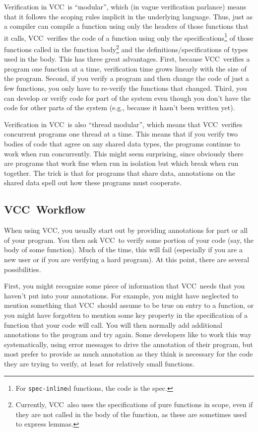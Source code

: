 \documentclass{report}
\newcommand{\Q}[1]{\lstinline~#1~}
\newcommand{\VCC}{VCC}
\begin{document}
Verification in \VCC\ is ``modular'', which (in vague verification
parlance) means that it follows the scoping rules implicit in the
underlying language. Thus, just as a compiler can compile a function
using only the headers of those functions that it calls,
\VCC\ verifies the code of a function using only the
specifications\footnote{For \Q{spec-inline}d functions, the code is the
  spec.} of those functions called in the function
body\footnote{Currently, \VCC\ also uses the specifications of pure functions
  in scope, even if they are not called in the body of the function,
  as these are sometimes used to express lemmas.} and the definitions/specifications of types used in the
body. This has three great advantages. First, because \VCC\ verifies a
program one function at a time, verification time grows linearly with
the size of the program. Second, if you verify a program and then
change the code of just a few functions, you only have to re-verify
the functions that changed. Third, you can develop or verify code for
part of the system even though you don't have the code for other parts
of the system (e.g., because it hasn't been written yet).

Verification in \VCC\ is also ``thread modular'', which means that \VCC\
verifies concurrent programs one thread at a time. This means that if
you verify two bodies of code that agree on any shared data types, the
programs continue to work when run concurrently. This might seem
surprising, since obviously there are programs that work fine when run
in isolation but which break when run together. The trick is that for
programs that share data, annotations on the shared data spell out how
these programs must cooperate.

\subsection{\VCC\ Workflow}

When using \VCC, you usually start out by providing annotations for
part or all of your program. You then ask \VCC\ to verify some portion
of your code (say, the body of some function). Much of the time, this
will fail (especially if you are a new user or if you are verifying a hard
program). At this point, there are several possibilities.

First, you might recognize some piece of information
that \VCC\ needs that you haven't put into your annotations. For
example, you might have neglected to mention something that
\VCC\ should assume to be true on entry to a function, or you might
have forgotten to mention some key property in the specification of a
function that your code will call. You will then normally
add additional annotations to the program and try again. Some
developers like to work this way systematically, using error messages
to drive the annotation of their program, but most prefer to provide
as much annotation as they think is necessary for the code they are
trying to verify, at least for relatively small functions.
\end{document}
